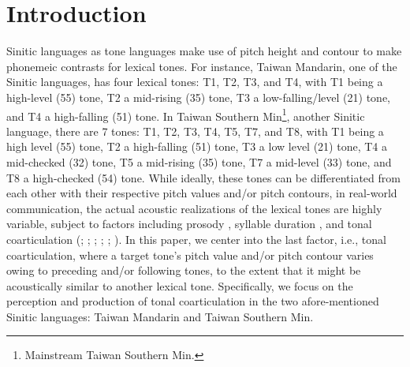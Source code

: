 
\chapter{Introduction}\label{chapter:Introduction}
Sinitic languages as tone languages make use of pitch height and contour to make phonemeic contrasts for lexical tones. For instance, Taiwan Mandarin, one of the Sinitic languages, has four lexical tones: T1, T2, T3, and T4, with T1 being a high-level (55) tone, T2 a mid-rising (35) tone, T3 a low-falling/level (21) tone, and T4 a high-falling (51) tone. In Taiwan Southern Min\footnote{Mainstream Taiwan Southern Min.}, another Sinitic language, there are 7 tones: T1, T2, T3, T4, T5, T7, and T8, with T1 being a high level (55) tone, T2 a high-falling (51) tone, T3 a low level (21) tone, T4 a mid-checked (32) tone, T5 a mid-rising (35) tone, T7 a mid-level (33) tone, and T8 a high-checked (54) tone. While ideally, these tones can be differentiated from each other with their respective pitch values and/or pitch contours, in real-world communication, the actual acoustic realizations of the lexical tones are highly variable, subject to factors including prosody \citep{Peng1997}, syllable duration \citep{XuWang2009}, and tonal coarticulation (\citealp{Shen1990}; \citealp{Xu1994}; \citealp{Peng1997}; \citeyear{Xu1997}; \citealp{Wang2002}; \citealp{ChangHsieh2012}). In this paper, we center into the last factor, i.e., tonal coarticulation, where a target tone's pitch value and/or pitch contour varies owing to preceding and/or following tones, to the extent that it might be acoustically similar to another lexical tone. Specifically, we focus on the perception and production of tonal coarticulation in the two afore-mentioned Sinitic languages: Taiwan Mandarin and Taiwan Southern Min.


